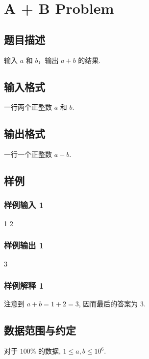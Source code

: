 \documentclass{article}
\begin{document}
  \newpage

  \section{A + B Problem}

  \subsection{题目描述}

  输入 $ a $ 和 $ b $，输出 $ a + b $ 的结果.

  \subsection{输入格式}

  一行两个正整数 $ a $ 和 $ b $.

  \subsection{输出格式}

  一行一个正整数 $ a + b $.

  \subsection{样例}

  \subsubsection{样例输入 1}

  1 2

  \subsubsection{样例输出 1}

  3
  
  \subsubsection{样例解释 1}

  注意到 $a + b = 1 + 2 = 3$, 因而最后的答案为 $3$.

  \subsection{数据范围与约定}

  对于 $ 100\% $ 的数据, $ 1 \leq a, b \leq 10 ^ 6 $.
\end{document}
